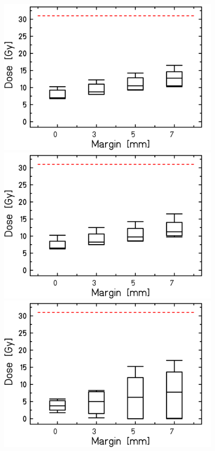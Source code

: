 \begin{figure}[H]
\begin{minipage}{0.31\textwidth}
  \includegraphics[width=\textwidth]{./teile/results_human/Whisker_AORTA_ITV.png}
\end{minipage}
\hfill
\begin{minipage}{0.31\textwidth}
\hspace*{-0.35cm}
 \includegraphics[width=\textwidth]{./teile/results_human/Whisker_AORTA_IMPT_woOverlap.png}
\end{minipage}
\hfill
\begin{minipage}{0.31\textwidth}
\hspace*{-0.5cm}
 \includegraphics[width=\textwidth]{./teile/results_human/Whisker_AORTA_IMPT_woOverlap_otherParameters.png}

\end{minipage}
\end{figure}
